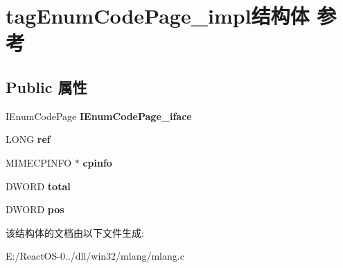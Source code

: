 \hypertarget{structtag_enum_code_page__impl}{}\section{tag\+Enum\+Code\+Page\+\_\+impl结构体 参考}
\label{structtag_enum_code_page__impl}
\subsection*{Public 属性}
\begin{DoxyCompactItemize}
\item 
\mbox{\label{structtag_enum_code_page__impl_ad98fe60778f32c59d41f99bad22026dd}} 
I\+Enum\+Code\+Page {\bfseries I\+Enum\+Code\+Page\+\_\+iface}
\item 
\mbox{\label{structtag_enum_code_page__impl_ae0ab4ac5b4d9c08a85274484e1d0444a}} 
L\+O\+NG {\bfseries ref}
\item 
\mbox{\label{structtag_enum_code_page__impl_a668f4f03f8cc0c31570671fd68776557}} 
M\+I\+M\+E\+C\+P\+I\+N\+FO $\ast$ {\bfseries cpinfo}
\item 
\mbox{\label{structtag_enum_code_page__impl_a2132a0dcfad8292eeceecae135e49bb9}} 
D\+W\+O\+RD {\bfseries total}
\item 
\mbox{\label{structtag_enum_code_page__impl_a585db48e09af87dd64e0e69fe5bba2f4}} 
D\+W\+O\+RD {\bfseries pos}
\end{DoxyCompactItemize}


该结构体的文档由以下文件生成\+:\begin{DoxyCompactItemize}
\item 
E\+:/\+React\+O\+S-\/0../dll/win32/mlang/mlang.\+c\end{DoxyCompactItemize}
